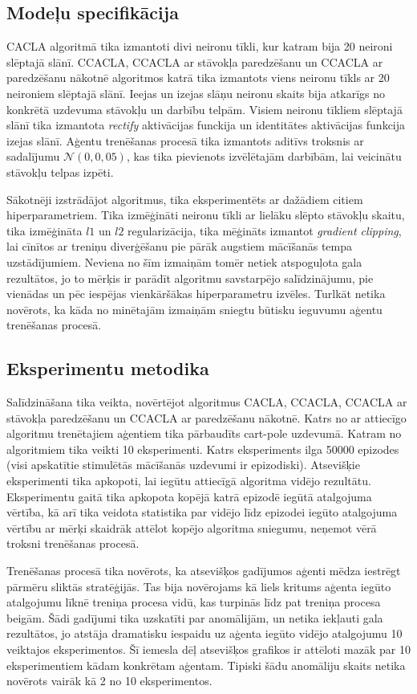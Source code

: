 \documentclass{ludis} %
\begin{document}
\subsection{Modeļu specifikācija}
CACLA algoritmā tika izmantoti divi neironu tīkli, kur katram bija 20
neironi slēptajā slānī. CCACLA, CCACLA ar stāvokļa paredzēšanu un CCACLA ar
paredzēšanu nākotnē algoritmos katrā tika izmantots viens neironu tīkls ar 20
neironiem slēptajā slānī. Ieejas un izejas slāņu neironu skaits bija atkarīgs no
konkrētā uzdevuma stāvokļu un darbību telpām. Visiem neironu tīkliem slēptajā
slānī tika izmantota \textit{rectify} aktivācijas funckija un identitātes
aktivācijas funkcija izejas slānī. Aģentu trenēšanas procesā tika izmantots
aditīvs troksnis ar sadalījumu $\mathcal{N}(0, 0,05)$, kas tika pievienots
izvēlētajām darbībām, lai veicinātu stāvokļu telpas izpēti.

Sākotnēji izstrādājot algoritmus, tika eksperimentēts ar dažādiem citiem
hiperparametriem. Tika izmēģināti neironu tīkli ar lielāku slēpto stāvokļu
skaitu, tika izmēģināta $l1$ un $l2$ regularizācija, tika mēģināts izmantot
\textit{gradient clipping}, lai cīnītos ar treniņu diverģēšanu pie pārāk
augstiem mācīšanās tempa uzstādījumiem. Neviena no šīm izmaiņām tomēr netiek
atspoguļota gala rezultātos, jo to mērķis ir parādīt algoritmu savstarpējo
salīdzinājumu, pie vienādas un pēc iespējas vienkāršākas hiperparametru izvēles.
Turlkāt netika novērots, ka kāda no minētajām izmaiņām sniegtu būtisku ieguvumu
aģentu trenēšanas procesā.


\subsection{Eksperimentu metodika}
Salīdzināšana tika veikta, novērtējot algoritmus CACLA, CCACLA, CCACLA ar
stāvokļa paredzēšanu un CCACLA ar paredzēšanu nākotnē. Katrs no ar attiecīgo
algoritmu trenētajiem aģentiem tika pārbaudīts cart-pole uzdevumā. Katram no
algoritmiem tika veikti 10 eksperimenti. Katrs eksperiments ilga 50000 epizodes
(visi apskatītie stimulētās mācīšanās uzdevumi ir epizodiski). Atsevišķie
eksperimenti tika apkopoti, lai iegūtu attiecīgā algoritma vidējo rezultātu.
Eksperimentu gaitā tika apkopota kopējā katrā epizodē iegūtā atalgojuma vērtība,
kā arī tika veidota statistika par vidējo līdz epizodei iegūto atalgojuma
vērtību ar mērķi skaidrāk attēlot kopējo algoritma sniegumu, neņemot vērā
troksni trenēšanas procesā.

Trenēšanas procesā tika novērots, ka atsevišķos gadījumos aģenti mēdza iestrēgt
pārmēru sliktās stratēģijās. Tas bija novērojams kā liels kritums aģenta iegūto
atalgojumu līknē treniņa procesa vidū, kas turpinās līdz pat treniņa procesa
beigām. Šādi gadījumi tika uzskatīti par anomālijām, un netika iekļauti gala
rezultātos, jo atstāja dramatisku iespaidu uz aģenta iegūto vidējo atalgojumu 10
veiktajos eksperimentos. Šī iemesla dēļ atsevišķos grafikos ir attēloti mazāk
par 10 eksperimentiem kādam konkrētam aģentam. Tipiski šādu anomāliju skaits
netika novērots vairāk kā 2 no 10 eksperimentos.
\end{document}
